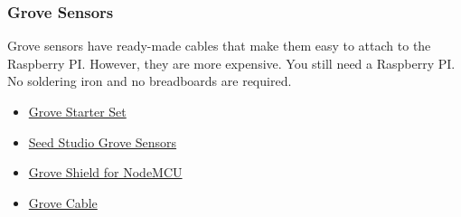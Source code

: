 \subsubsection{Grove Sensors}\label{grove-sensors}

Grove sensors have ready-made cables that make them easy to attach to
the Raspberry PI. However, they are more expensive. You still need a
Raspberry PI. No soldering iron and no breadboards are required.

\begin{itemize}
\tightlist
\item
  \href{https://www.seeedstudio.com/Grove-Starter-Kit-for-Arduino-p-1855.html}{Grove
  Starter Set}
\item
  \href{https://www.seeedstudio.com/category/Grove-c-1003.html}{Seed
  Studio Grove Sensors}
\item
  \href{https://www.seeedstudio.com/Grove-Base-Shield-for-NodeMCU-p-2513.html}{Grove
  Shield for NodeMCU}
\item
  \href{http://www.switchdoc.com/2016/02/tutorial-intro-to-grove-connectors-for-arduinoraspberry-pi-projects/}{Grove
  Cable}
\end{itemize}
